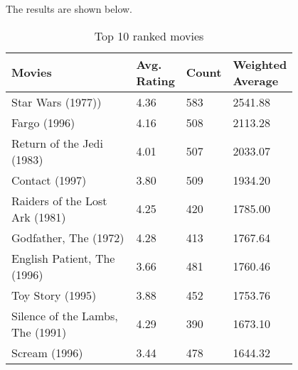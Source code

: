 \documentclass[12pt]{article}
\begin{document}
The results are shown below.
\\
\begin{table}[h]
\centering
\caption{Top 10 ranked movies}
\label{tbl:simple}
\begin{tabular}{p{0.50\linewidth}p{0.10\linewidth}p{0.10\linewidth}p{0.10\linewidth}}
\hline
\textbf{Movies} & \textbf{Avg. Rating} & \textbf{Count} & \textbf{Weighted Average} \\ \hline \hline
               Star Wars (1977))&            4.36&          583&          2541.88 \\ \hline
                    Fargo (1996)&            4.16&          508&          2113.28 \\ \hline
       Return of the Jedi (1983)&            4.01&          507&          2033.07 \\ \hline
                  Contact (1997)&            3.80&          509&          1934.20 \\ \hline
  Raiders of the Lost Ark (1981)&            4.25&          420&          1785.00 \\ \hline
           Godfather, The (1972)&            4.28&          413&          1767.64 \\ \hline
     English Patient, The (1996)&            3.66&          481&          1760.46 \\ \hline
                Toy Story (1995)&            3.88&          452&          1753.76 \\ \hline
Silence of the Lambs, The (1991)&            4.29&          390&          1673.10 \\ \hline
                   Scream (1996)&            3.44&          478&          1644.32 \\ \hline \hline
\end{tabular}
\end{table}
\\
\end{document}

